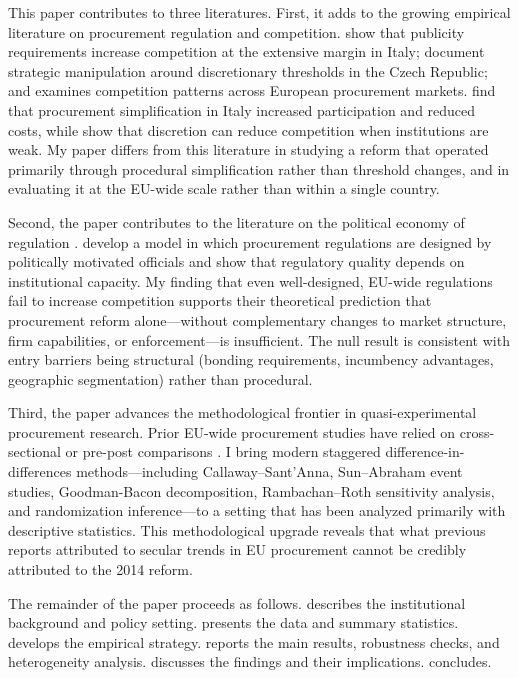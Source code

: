 \documentclass[12pt]{article}
\begin{document}
This paper contributes to three literatures. First, it adds to the growing empirical literature on procurement regulation and competition. \citet{coviellaMariniello2014} show that publicity requirements increase competition at the extensive margin in Italy; \citet{palgutaPertold2017} document strategic manipulation around discretionary thresholds in the Czech Republic; and \citet{szucs2023} examines competition patterns across European procurement markets. \citet{cingano2023} find that procurement simplification in Italy increased participation and reduced costs, while \citet{baltrunaite2021} show that discretion can reduce competition when institutions are weak. My paper differs from this literature in studying a reform that operated primarily through procedural simplification rather than threshold changes, and in evaluating it at the EU-wide scale rather than within a single country.

Second, the paper contributes to the literature on the political economy of regulation \citep{stigler1971, bosio2022}. \citet{bosio2022} develop a model in which procurement regulations are designed by politically motivated officials and show that regulatory quality depends on institutional capacity. My finding that even well-designed, EU-wide regulations fail to increase competition supports their theoretical prediction that procurement reform alone---without complementary changes to market structure, firm capabilities, or enforcement---is insufficient. The null result is consistent with entry barriers being structural (bonding requirements, incumbency advantages, geographic segmentation) rather than procedural.

Third, the paper advances the methodological frontier in quasi-experimental procurement research. Prior EU-wide procurement studies have relied on cross-sectional or pre-post comparisons \citep{kutlinaDimitrovaLakatos2016, europeancommission2019}. I bring modern staggered difference-in-differences methods---including Callaway--Sant'Anna, Sun--Abraham event studies, Goodman-Bacon decomposition, Rambachan--Roth sensitivity analysis, and randomization inference---to a setting that has been analyzed primarily with descriptive statistics. This methodological upgrade reveals that what previous reports attributed to secular trends in EU procurement cannot be credibly attributed to the 2014 reform.

The remainder of the paper proceeds as follows.  describes the institutional background and policy setting.  presents the data and summary statistics.  develops the empirical strategy.  reports the main results, robustness checks, and heterogeneity analysis.  discusses the findings and their implications.  concludes.
\end{document}
